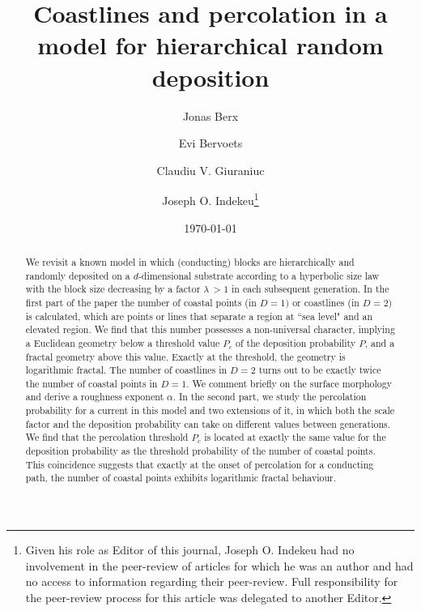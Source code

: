 \documentclass[amsmath,amssymb,amsfonts,aps,pre,preprint,superscriptaddress,bibnotes,showpacs,showkeys,longbibliography,nofootinbib]{revtex4-1}
\begin{document}
\title{Coastlines and percolation in a model for hierarchical random deposition}

\author{Jonas Berx}

\author{Evi Bervoets}

\author{Claudiu V. Giuraniuc}

\author{Joseph O. Indekeu\footnote{Given his role as Editor of this journal, Joseph O. Indekeu had no involvement in the peer-review of articles for which he was an author and had no access to information regarding their peer-review. Full responsibility for the peer-review process for this article was delegated to another Editor.}}

\date{\today}

\begin{abstract}
We revisit a known model in which (conducting) blocks are hierarchically and randomly deposited on a $d$-dimensional substrate according to a hyperbolic size law with the block size decreasing by a factor $\lambda \, >  1$ in each subsequent generation. In the first part of the paper the number of coastal points (in $D=1)$ or coastlines (in $D=2)$ is calculated, which are points or lines that separate a region at ``sea level" and an elevated region. We find that this number possesses a non-universal character, implying a Euclidean geometry below a threshold value $P_c$ of the deposition probability $P$, and a fractal geometry above this value. Exactly at the threshold, the geometry is logarithmic fractal. The number of coastlines in $D=2$ turns out to be exactly twice the number of coastal points in $D=1$. We comment briefly on the surface morphology and derive a roughness exponent $\alpha$. In the second part, we study the percolation probability for a current in this model and two extensions of it, in which both the scale factor and the deposition probability can take on different values between generations. We find that the percolation threshold $P_c$ is located at exactly the same value for the deposition probability as the threshold probability of the number of coastal points. This coincidence suggests that exactly at the onset of percolation for a conducting path, the number of coastal points exhibits logarithmic fractal behaviour. 

\end{abstract}
\end{document}
